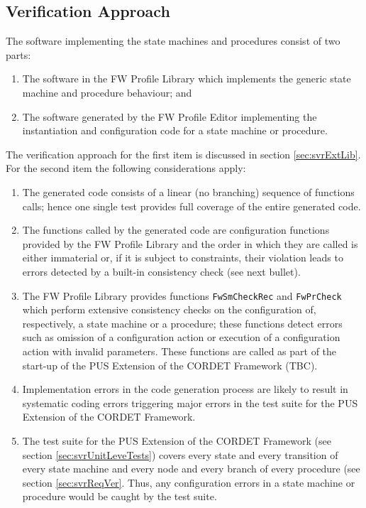 \documentclass{pnp_article}
\begin{document}
\subsection{Verification Approach}
The software implementing the state machines and procedures consist of two parts:

\begin{enumerate}
\item The software in the FW Profile Library which implements the generic state machine and procedure behaviour; and
\item The software generated by the FW Profile Editor implementing the instantiation and configuration code for a state machine or procedure.
\end{enumerate}

The verification approach for the first item is discussed in section \ref{sec:svrExtLib}. For the second item the following considerations apply:

\begin{enumerate}
\item The generated code consists of a linear (no branching) sequence of functions calls; hence one single test provides full coverage of the entire generated code.
\item The functions called by the generated code are configuration functions provided by the FW Profile Library and the order in which they are called is either immaterial or, if it is subject to constraints, their violation leads to errors detected by a built-in consistency check (see next bullet).
\item The FW Profile Library provides functions \texttt{FwSmCheckRec} and \texttt{FwPrCheck} which perform extensive consistency checks on the configuration of, respectively, a state machine or a procedure; these functions detect errors such as omission of a configuration action or execution of a configuration action with invalid parameters. These functions are called as part of the start-up of the PUS Extension of the CORDET Framework (TBC).
\item Implementation errors in the code generation process are likely to result in systematic coding errors triggering major errors in the test suite for the PUS Extension of the CORDET Framework.
\item The test suite for the PUS Extension of the CORDET Framework (see section \ref{sec:svrUnitLeveTests}) covers every state and every transition of every state machine and every node and every branch of every procedure (see section \ref{sec:svrReqVer}. Thus, any configuration errors in a state machine or procedure would be caught by the test suite.
\end{enumerate}
\end{document}
